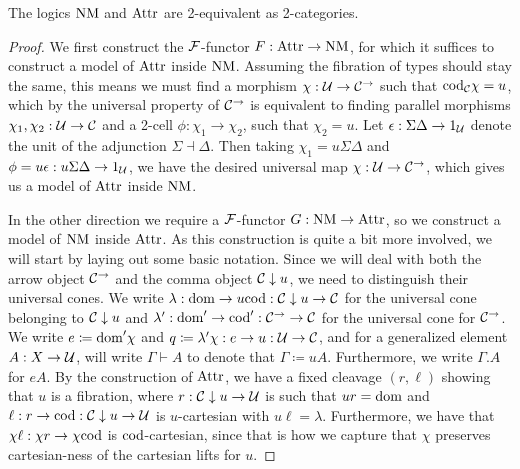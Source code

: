 \documentclass[../thesis.tex]{subfiles}
\begin{document}
\begin{proposition}
  The logics ${\mathrm{NM}}$ and ${\mathrm{Attr}}$ are 2-equivalent as 2-categories.
\end{proposition}
\begin{proof}
  We first construct the ${\mathcal{F}}$-functor $F : {\mathrm{Attr}} \to {\mathrm{NM}}$, for which it suffices to construct a model of
  ${\mathrm{Attr}}$ inside ${\mathrm{NM}}$. Assuming the fibration of types should stay the same, this means we must find a
  morphism $\chi : {\mathcal{U}} \to {\mathcal{C}}^\to$ such that ${\mathrm{cod}}_{\mathcal{C}}\chi = u$, which by the universal property of
  ${\mathcal{C}}^\to$ is equivalent to finding parallel morphisms $\chi_1,\chi_2 : {\mathcal{U}} \to {\mathcal{C}}$ and a 2-cell $\phi
  : \chi_1 \to \chi_2$, such that $\chi_2 = u$. Let $\epsilon : \Sigma\Delta \to 1_{\mathcal{U}}$ denote the unit
  of the adjunction $\Sigma \dashv \Delta$. Then taking $\chi_1 = u\Sigma\Delta$ and $\phi = u\epsilon
  : u\Sigma\Delta \to 1_{\mathcal{U}}$, we have the desired universal map $\chi : {\mathcal{U}} \to {\mathcal{C}}^\to$, which gives
  us a model of ${\mathrm{Attr}}$ inside ${\mathrm{NM}}$. 

  In the other direction we require a ${\mathcal{F}}$-functor $G : {\mathrm{NM}} \to {\mathrm{Attr}}$, so we construct a model of ${\mathrm{NM}}$
  inside ${\mathrm{Attr}}$. As this construction is quite a bit more involved, we will start by laying out some basic
  notation. Since we will deal with both the arrow object ${\mathcal{C}}^\to$ and the comma object ${\mathcal{C}} \mathrel{\downarrow} u$, we
  need to distinguish their universal cones. We write $\lambda : {\mathrm{dom}} \to u{\mathrm{cod}} : {\mathcal{C}} \mathrel{\downarrow} u \to {\mathcal{C}}$ for
  the universal cone belonging to ${\mathcal{C}}\mathrel{\downarrow} u$ and $\lambda' : {\mathrm{dom}}' \to {\mathrm{cod}}' : {\mathcal{C}}^\to \to {\mathcal{C}}$ for the
  universal cone for ${\mathcal{C}}^\to$. We write $e \coloneq {\mathrm{dom}}'\chi$ and $q \coloneq \lambda' \chi : e \to u :
  {\mathcal{U}} \to {\mathcal{C}}$, and for a generalized element $A : X \to {\mathcal{U}}$, will write $\Gamma \vdash A$ to denote that
  $\Gamma \coloneq uA$. Furthermore, we write $\Gamma.A$ for $eA$. By the construction of ${\mathrm{Attr}}$, we have
  a fixed cleavage $(r,\ell)$ showing that $u$ is a fibration, where $r : {\mathcal{C}} \mathrel{\downarrow} u \to {\mathcal{U}}$ is such
  that $ur = {\mathrm{dom}}$ and $\ell : r \to {\mathrm{cod}} : {\mathcal{C}}\mathrel{\downarrow} u \to {\mathcal{U}}$ is $u$-cartesian with $u\ell = \lambda$.
  Furthermore, we have that $\chi\ell : \chi r \to \chi{\mathrm{cod}}$ is ${\mathrm{cod}}$-cartesian, since that is how we capture
  that $\chi$ preserves cartesian-ness of the cartesian lifts for $u$.


\end{proof}
\end{document}

